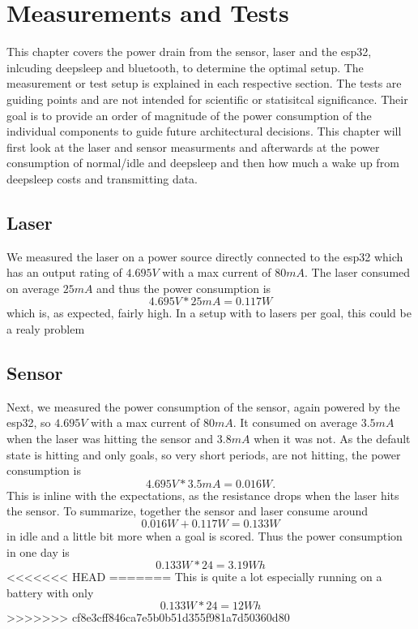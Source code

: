 \section{Measurements and Tests}
This chapter covers the power drain from the sensor, laser and the esp32, inlcuding deepsleep and bluetooth, to determine the optimal setup. The measurement or test setup is explained in each respective section. The tests are guiding points and are not intended for scientific or statisitcal significance. Their goal is to provide an order of magnitude of the power consumption of the individual components to guide future architectural decisions. This chapter will first look at the laser and sensor measurments and afterwards at the power consumption of normal/idle and deepsleep and then how much a wake up from deepsleep costs and transmitting data.


\subsection{Laser}
We measured the laser on a power source directly connected to the esp32 which has an output rating of $4.695V$ with a max current of $80mA$. The laser consumed on average $25mA$ and thus the power consumption is
\begin{equation*}
    4.695V * 25mA = 0.117W
\end{equation*}
which is, as expected, fairly high. In a setup with to lasers per goal, this could be a realy problem


\subsection{Sensor}
Next, we measured the power consumption of the sensor, again powered by the esp32, so $4.695V$ with a max current of $80mA$. It consumed on average $3.5mA$ when the laser was hitting the sensor and $3.8mA$ when it was not. As the default state is hitting and only goals, so very short periods, are not hitting, the power consumption is
  \begin{equation*}
      4.695V * 3.5mA = 0.016W.
    \end{equation*}
This is inline with the expectations, as the resistance drops when the laser hits the sensor. 
To summarize, together the sensor and laser consume around  
\begin{equation*}
    0.016W + 0.117W = 0.133W
  \end{equation*}
in idle and a little bit more when a goal is scored. Thus the power consumption in one day is
\begin{equation*}
    0.133W * 24 = 3.19Wh
\end{equation*}
<<<<<<< HEAD
=======
This is quite a lot especially running on a battery with only
\begin{equation*}
    0.133W * 24 = 12Wh
\end{equation*}
>>>>>>> cf8e3cff846ca7e5b0b51d355f981a7d50360d80

